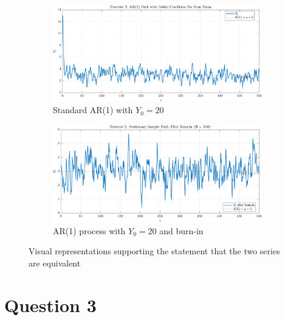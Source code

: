 \documentclass[dvipsnames,11pt]{article}
\begin{document}
\begin{solution}
        \begin{figure}[h]
            \centering
                \begin{subfigure}[b]{0.49\textwidth}
                    \centering
                    \includegraphics[width=\textwidth, trim=0cm 0cm 0cm 0.55cm, clip]{output/ex2_path_far_from_mean.png}
                    \caption{Standard AR(1) with \(Y_0=20\)}
                    \label{fig:ex2_path_far_from_mean}
                \end{subfigure}
              \hfill
                \begin{subfigure}[b]{0.49\textwidth}
                    \centering
                    \includegraphics[width=\textwidth, trim=0cm 0cm 0cm 0.55cm, clip]{output/ex2_path_after_burnin.png}
                    \caption{AR(1) process with \(Y_0=20\) and burn-in}
                    \label{fig:ex2_path_after_burnin}
                \end{subfigure}
            \caption{Visual representations supporting the statement that the two series are equivalent}
            \label{fig:ex_2c}
        \end{figure}

        
    \end{solution}

\section*{Question 3}
\setcounter{section}{3}
\end{document}
